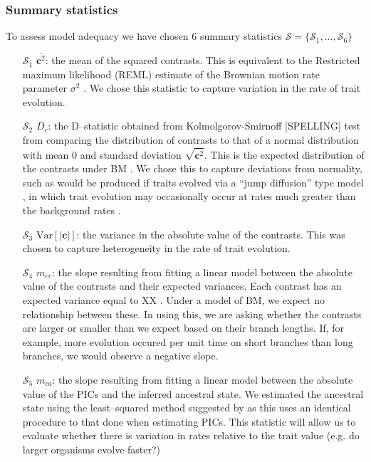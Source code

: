 \documentclass[12pt]{article}
\begin{document}
\subsubsection{Summary statistics}

To assess model adequacy we have chosen 6 summary statistics $\mathcal{S} = \lbrace \mathcal{S}_1, \ldots, \mathcal{S}_6 \rbrace$ 

\begin{enumerate}
\item[$\mathcal{S}_1$] $\overline{\mathbf{c}^2}$: the mean of the squared contrasts. This is equivalent to the Restricted maximum likelihood (REML) estimate of the Brownian motion rate parameter $\sigma^2$ \citep{Garland1992, Rohlf2001}. We chose this statistic to capture variation in the rate of trait evolution.

\item[$\mathcal{S}_2$] $D_c$: the D--statistic obtained from Kolmolgorov-Smirnoff [SPELLING] test \citep{ks} from comparing the distribution of contrasts to that of a normal distribution with mean 0 and standard deviation $\sqrt{\overline{\mathbf{c}^2}}$. This is the expected distribution of the contrasts under BM \citep{Felsenstein1985, Rohlf2001}. We chose this to capture deviations from normality, such as would be produced if traits evolved via a ``jump diffusion'' type model \citep{Landis2013, Eastmanjump}, in which trait evolution may occasionally occur at rates much greater than the background rates \citep[see][]{PennellPE}.

\item[$\mathcal{S}_3$] $\mathrm{Var}[| \mathbf{c} |]$: the variance in the absolute value of the contrasts. This was chosen to capture heterogeneity in the rate of trait evolution.

\item[$\mathcal{S}_4$] $m_{cv}$: the slope resulting from fitting a linear model between the absolute value of the contrasts and their expected variances. Each contrast has an expected variance equal to XX \citep{Felsenstein1985}. Under a model of BM, we expect no relationship between these. In using this, we are asking whether the contrasts are larger or smaller than we expect based on their branch lengths. If, for example, more evolution occured per unit time on short branches than long branches, we would observe a negative slope. \citep{Garlandetal1992}

\item[$\mathcal{S}_5$] $m_{ca}$: the slope resulting from fitting a linear model between the absolute value of the PICs and the inferred ancestral state. We estimated the ancestral state using the least--squared method suggested by \citep{Felsenstein1985} as this uses an identical procedure to that done when estimating PICs. This statistic will allow us to evaluate whether there is variation in rates relative to the trait value (e.g. do larger organisms evolve faster?) \citep{Garlandetal1992}


\end{enumerate}
\end{document}
